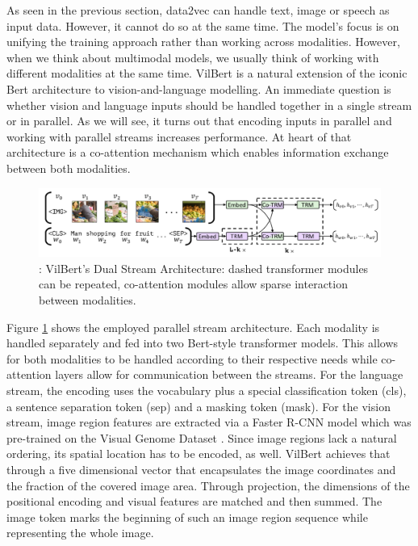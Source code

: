 \documentclass[
]{krantz}
\begin{document}
As seen in the previous section, data2vec can handle text, image or speech as input data. However, it cannot do so at the same time. The model's focus is on unifying the training approach rather than working across modalities. However, when we think about multimodal models, we usually think of working with different modalities at the same time. VilBert \citep{lu2019vilbert} is a natural extension of the iconic Bert architecture \citep{devlin2018bert} to vision-and-language modelling. An immediate question is whether vision and language inputs should be handled together in a single stream or in parallel. As we will see, it turns out that encoding inputs in parallel and working with parallel streams increases performance. At heart of that architecture is a co-attention mechanism which enables information exchange between both modalities.

\begin{figure}

{\centering \includegraphics[width=1\linewidth]{figures/05-chapter2/vilbertarc} 

}

\caption{\citet{lu2019vilbert}: VilBert's Dual Stream Architecture: dashed transformer modules can be repeated, co-attention modules allow sparse interaction between modalities.}\label{fig:vilbertarc}
\end{figure}



Figure \ref{fig:vilbertarc} shows the employed parallel stream architecture. Each modality is handled separately and fed into two Bert-style transformer models. This allows for both modalities to be handled according to their respective needs while co-attention layers allow for communication between the streams. For the language stream, the encoding uses the vocabulary plus a special classification token (cls), a sentence separation token (sep) and a masking token (mask). For the vision stream, image region features are extracted via a Faster R-CNN \citep{ren2015faster} model which was pre-trained on the Visual Genome Dataset \citep{krishnavisualgenome}. Since image regions lack a natural ordering, its spatial location has to be encoded, as well. VilBert achieves that through a five dimensional vector that encapsulates the image coordinates and the fraction of the covered image area. Through projection, the dimensions of the positional encoding and visual features are matched and then summed. The image token marks the beginning of such an image region sequence while representing the whole image.
\end{document}
